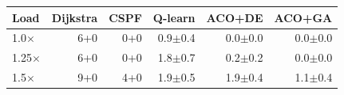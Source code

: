 \begin{tabular}{@{}lrrrrr@{}}
\toprule
Load & Dijkstra & CSPF & Q-learn & ACO+DE & ACO+GA\\
\midrule
1.0$\times$ & 6+0 & 0+0 & 0.9$\pm$0.4 & 0.0$\pm$0.0 & 0.0$\pm$0.0\\
1.25$\times$ & 6+0 & 0+0 & 1.8$\pm$0.7 & 0.2$\pm$0.2 & 0.0$\pm$0.0\\
1.5$\times$ & 9+0 & 4+0 & 1.9$\pm$0.5 & 1.9$\pm$0.4 & 1.1$\pm$0.4\\
\bottomrule
\end{tabular}
